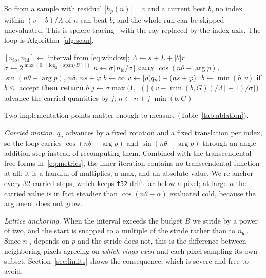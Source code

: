 So from a sample with residual $|h_p(n)| = v$ and a current best $b$, no index
within $(v-b)/\Lambda$ of $n$ can beat $b$, and the whole run can be skipped
unevaluated. This is sphere tracing~\cite{Hart1996Sphere} with the ray replaced by the
index axis. The loop is Algorithm~\ref{alg:scan}.

\begin{algorithm}[t]
\caption{Ring scan, given $p$, the family parameters, the budget $B$, the guard
$G$, and the accept threshold $h-a$. With
$\mathrm{span}=n_{\mathrm{hi}}-n_{\mathrm{lo}}+1$, exact when
$\mathrm{span}\le B$ (Theorem~\ref{thm:window}).}
\label{alg:scan}
\begin{algorithmic}[1]
\State $[n_{\mathrm{lo}}, n_{\mathrm{hi}}] \gets$ interval from \eqref{eq:window};
       $\Lambda \gets s + L + |\theta| r$
\State $\sigma \gets 2^{\max(0,\,\lceil \log_2(\mathrm{span}/B) \rceil)}$ 
\State $n \gets \sigma\lceil n_{\mathrm{lo}}/\sigma \rceil$ 
\State carry $\cos(n\theta-\arg p)$, $\sin(n\theta-\arg p)$, $n\delta$, $ns+\varphi$
\State $b \gets \infty$
  \State $v \gets |\rho(q_n) - (ns+\varphi)|$ 
  \State $b \gets \min(b, v)$
  \State \textbf{if} $b \le$ accept \textbf{then return} $b$
  \State $j \gets \sigma\max\bigl(1, \lceil (\lfloor (v - \min(b,G))/\Lambda \rfloor + 1)/\sigma \rceil\bigr)$
  \State advance the carried quantities by $j$; $n \gets n + j$
\EndFor
\State \Return $\min(b, G)$
\end{algorithmic}
\end{algorithm}

Two implementation points matter enough to measure (Table~\ref{tab:ablation}).

\emph{Carried motion.} $q_n$ advances by a fixed rotation and a fixed translation
per index, so the loop carries $\cos(n\theta-\arg p)$ and $\sin(n\theta-\arg p)$
through an angle-addition step instead of recomputing them. Combined with the
transcendental-free forms in~\eqref{eq:metrics}, the inner iteration contains no
transcendental function at all: it is a handful of multiplies, a max, and an
absolute value. We re-anchor every $32$ carried steps, which keeps
\texttt{f32} drift far below a pixel; at large $n$ the carried value is in fact steadier than
$\cos(n\theta-\alpha)$ evaluated cold, because the argument does not grow.

\emph{Lattice anchoring.} When the interval exceeds the budget $B$ we stride by a
power of two, and the start is snapped to a multiple of the stride rather than to
$n_{\mathrm{lo}}$. Since $n_{\mathrm{lo}}$ depends on $p$ and the stride does not,
this is the difference between neighboring pixels agreeing on \emph{which rings
exist} and each pixel sampling its own subset. Section~\ref{sec:limits} shows the
consequence, which is severe and free to avoid.

